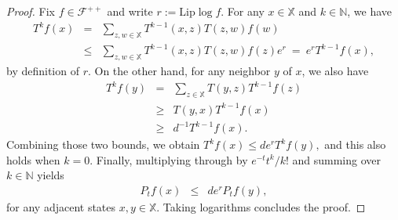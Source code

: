 \documentclass[12pt,final]{article}
\numberwithin{equation}{section}
\newcommand{\Lip}{\mathrm {Lip}}
\newcommand{\dN}{\mathbb {N}}
\newcommand{\cF}{\mathcal {F}}
\newcommand{\dX}{\mathbb{X}}
\begin{document}
\begin{proof}
Fix $f\in\cF^{++}$ and write $r:=\Lip \log f$. For any $x\in\dX$ and $k\in\dN$, we have
\begin{eqnarray*}
T^{k}f(x) &  = & \sum_{z,w\in\dX}T^{k-1}(x,z)T(z,w)f(w)\\
& \le & \sum_{z,w\in\dX}T^{k-1}(x,z)T(z,w)f(z)e^{r}\ = \ e^{r} T^{k-1}f(x),
\end{eqnarray*}
by definition of $r$. On the other hand, for any neighbor $y$ of $x$, we also have
\begin{eqnarray*}
T^{k}f(y) &  = & \sum_{z\in\dX}T(y,z)T^{k-1}f(z)\\
& \ge & T(y,x)T^{k-1}f(x)\\
& \ge & d^{-1}T^{k-1}f(x).
\end{eqnarray*}
Combining those two bounds, we obtain 
$
T^{k}f(x)  \le  de^{r}T^{k}f(y),
$
and this also holds  when $k=0$. Finally, multiplying through by $e^{-t}t^k/k!$ and summing over $k\in\mathbb N$ yields
\begin{eqnarray*}
P_tf(x) & \le & de^{r}P_tf(y),
\end{eqnarray*}
for any adjacent states $x,y\in\dX$. Taking logarithms concludes the proof. 
\end{proof}
\end{document}
